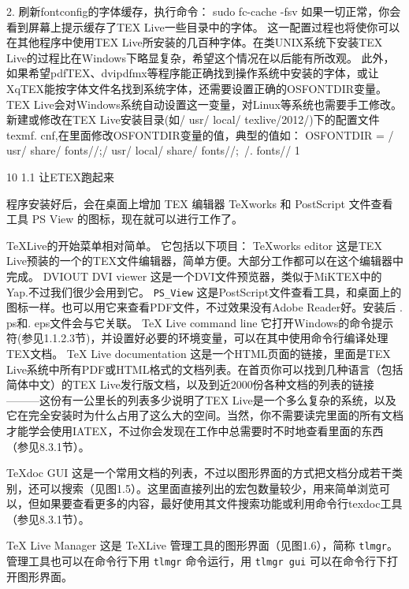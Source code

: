 \documentclass[UTF8]{ctexart}
\begin{document}
2. 刷新fontconfig的字体缓存，执行命令：
sudo fc-cache -fsv
如果一切正常，你会看到屏幕上提示缓存了TEX Live一些目录中的字体。
这一配置过程也将使你可以在其他程序中使用TEX Live所安装的几百种字体。在类UNIX系统下安装TEX Live的过程比在Windows下略显复杂，希望这个情况在以后能有所改观。
此外，如果希望pdfTEX、dvipdfmx等程序能正确找到操作系统中安装的字体，或让XqTEX能按字体文件名找到系统字体，还需要设置正确的OSFONTDIR变量。TEX Live会对Windows系统自动设置这一变量，对Linux等系统也需要手工修改。新建或修改在TEX Live安装目录(如/ usr/ local/ texlive/2012/)下的配置文件texmf. cnf,在里面修改OSFONTDIR变量的值，典型的值如：
OSFONTDIR = / usr/ share/ fonts//;/ usr/ local/ share/ fonts//;~/. fonts//
1

10	1.1 让ETEX跑起来

程序安装好后，会在桌面上增加 TEX 编辑器 TeXworks 和 PostScript 文件查看工具 PS View 的图标，现在就可以进行工作了。

\TeX Live的开始菜单相对简单。
它包括以下项目：
TeXworks editor
这是TEX Live预装的一个的TEX文件编辑器，简单方便。大部分工作都可以在这个编辑器中完成。
DVIOUT DVI viewer
这是一个DVI文件预览器，类似于MiKTEX中的Yap.不过我们很少会用到它。
\verb|PS_View|
这是PostScript文件查看工具，和桌面上的图标一样。也可以用它来查看PDF文件，不过效果没有Adobe Reader好。安装后 . ps和. eps文件会与它关联。
TeX Live command line
它打开Windows的命令提示符(参见1.1.2.3节)，并设置好必要的环境变量，可以在其中使用命令行编译处理TEX文档。
TeX Live documentation
这是一个HTML页面的链接，里面是TEX Live系统中所有PDF或HTML格式的文档列表。在首页你可以找到几种语言（包括简体中文）的TEX Live发行版文档，以及到近2000份各种文档的列表的链接———这份有一公里长的列表多少说明了TEX Live是一个多么复杂的系统，以及它在完全安装时为什么占用了这么大的空间。当然，你不需要读完里面的所有文档才能学会使用IATEX，不过你会发现在工作中总需要时不时地查看里面的东西（参见8.3.1节）。

TeXdoc GUI
这是一个常用文档的列表，不过以图形界面的方式把文档分成若干类别，还可以搜索（见图1.5）。这里面直接列出的宏包数量较少，用来简单浏览可以，但如果要查看更多的内容，最好使用其文件搜索功能或利用命令行texdoc工具（参见8.3.1节）。

TeX Live Manager
这是 \TeX Live 管理工具的图形界面（见图1.6），简称 \verb|tlmgr|。
管理工具也可以在命令行下用 \verb|tlmgr| 命令运行，用 \verb|tlmgr gui| 可以在命令行下打开图形界面。
\end{document}
